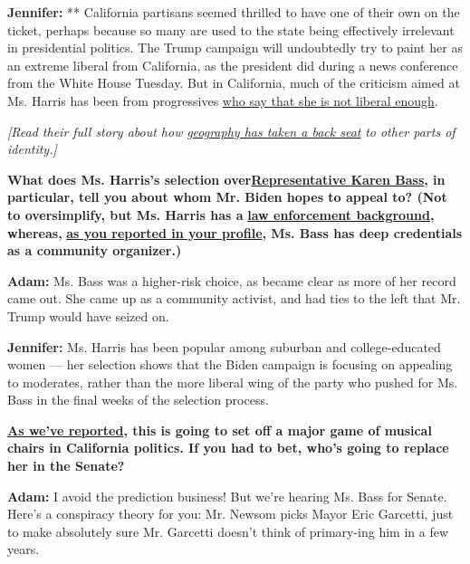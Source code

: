 \textbf{Jennifer:} ** California partisans seemed thrilled to have one
of their own on the ticket, perhaps because so many are used to the
state being effectively irrelevant in presidential politics. The Trump
campaign will undoubtedly try to paint her as an extreme liberal from
California, as the president did during a news conference from the White
House Tuesday. But in California, much of the criticism aimed at Ms.
Harris has been from progressives
\href{https://www.nytimes3xbfgragh.onion/2019/02/11/us/kamala-harris-progressive-prosecutor.html}{who
say that she is not liberal enough}.

\emph{{[}Read their full story about how}
\href{https://www.nytimes3xbfgragh.onion/2020/08/11/us/politics/harris-biden-geography-balance.html}{\emph{geography
has taken a back seat}} \emph{to other parts of identity.{]}}

\textbf{What does Ms. Harris's selection
over\href{https://www.nytimes3xbfgragh.onion/2020/08/04/us/politics/karen-bass-vice-president-biden.html}{Representative
Karen Bass}, in particular, tell you about whom Mr. Biden hopes to
appeal to? (Not to oversimplify, but Ms. Harris has a}
\textbf{\href{https://www.nytimes3xbfgragh.onion/2020/08/09/us/politics/kamala-harris-policing.html?action=click\&module=RelatedLinks\&pgtype=Article}{law
enforcement background}, whereas,}
\textbf{\href{https://www.nytimes3xbfgragh.onion/2020/08/04/us/politics/karen-bass-vice-president-biden.html}{as
you reported in your profile}, Ms. Bass has deep credentials as a
community organizer.)}

\textbf{Adam:} Ms. Bass was a higher-risk choice, as became clear as
more of her record came out. She came up as a community activist, and
had ties to the left that Mr. Trump would have seized on.

\textbf{Jennifer:} Ms. Harris has been popular among suburban and
college-educated women --- her selection shows that the Biden campaign
is focusing on appealing to moderates, rather than the more liberal wing
of the party who pushed for Ms. Bass in the final weeks of the selection
process.

\textbf{\href{https://www.nytimes3xbfgragh.onion/2020/08/04/us/biden-vp-karen-bass-kamala-harris.html}{As
we've reported}, this is going to set off a major game of musical chairs
in California politics. If you had to bet, who's going to replace her in
the Senate?}

\textbf{Adam:} I avoid the prediction business! But we're hearing Ms.
Bass for Senate. Here's a conspiracy theory for you: Mr. Newsom picks
Mayor Eric Garcetti, just to make absolutely sure Mr. Garcetti doesn't
think of primary-ing him in a few years.

